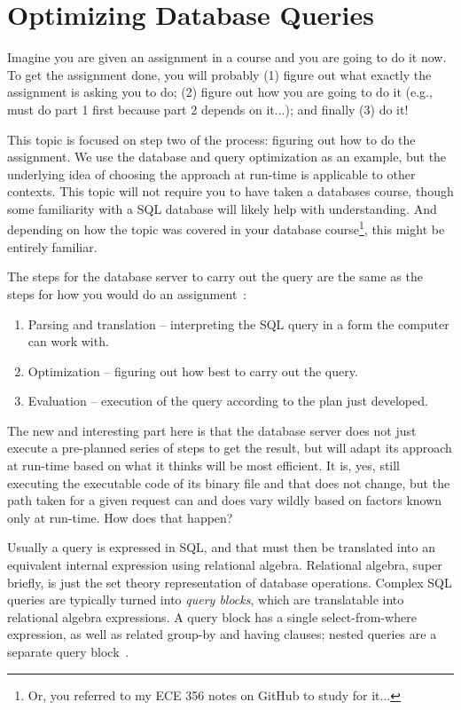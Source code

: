 




\section*{Optimizing Database Queries}

Imagine you are given an assignment in a course and you are going to do it now. To get the assignment done, you will probably (1) figure out what exactly the assignment is asking you to do; (2) figure out how you are going to do it (e.g., must do part 1 first because part 2 depends on it...); and finally (3) do it! 

This topic is focused on step two of the process: figuring out how to do the assignment. We use the database and query optimization as an example, but the underlying idea of choosing the approach at run-time is applicable to other contexts. This topic will not require you to have taken a databases course, though some familiarity with a SQL database will likely help with understanding. And depending on how the topic was covered in your database course\footnote{Or, you referred to my ECE 356 notes on GitHub to study for it...}, this might be entirely familiar.

The steps for the database server to carry out the query are the same as the steps for how you would do an assignment~\cite{dsc}:

\begin{enumerate}
	\item Parsing and translation -- interpreting the SQL query in a form the computer can work with.
	\item Optimization -- figuring out how best to carry out the query.
	\item Evaluation -- execution of the query according to the plan just developed.
\end{enumerate}

The new and interesting part here is that the database server does not just execute a pre-planned series of steps to get the result, but will adapt its approach at run-time based on what it thinks will be most efficient. It is, yes, still executing the executable code of its binary file and that does not change, but the path taken for a given request can and does vary wildly based on factors known only at run-time. How does that happen?

Usually a query is expressed in SQL, and that must then be translated into an equivalent internal expression using relational algebra. Relational algebra, super briefly, is just the set theory representation of database operations. Complex SQL queries are typically turned into \textit{query blocks}, which are translatable into relational algebra expressions. A query block has a single select-from-where expression, as well as related group-by and having clauses; nested queries are a separate query block~\cite{fds}.

